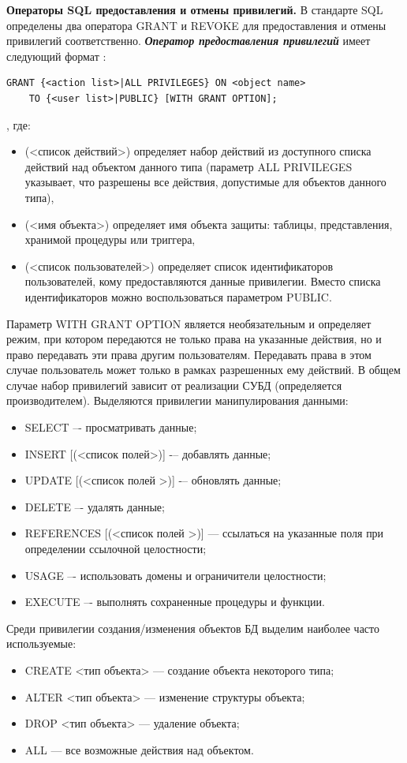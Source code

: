 \textbf{Операторы SQL предоставления и отмены привилегий.} В стандарте SQL определены два оператора GRANT и
REVOKE для предоставления и отмены привилегий соответственно. \textit{\textbf{Оператор предоставления привилегий}}
имеет следующий формат \autocite{Skakun}:
\begin{lstlisting}[]
GRANT {<action list>|ALL PRIVILEGES} ON <object name>
    TO {<user list>|PUBLIC} [WITH GRANT OPTION];
\end{lstlisting}
, где:
\begin{itemize}
    \item <action list>(<список действий>) определяет набор действий из доступного списка действий над объектом
    данного типа (параметр ALL PRIVILEGES указывает, что разрешены все действия, допустимые для объектов данного
    типа),
    \item <object name>(<имя объекта>) определяет имя объекта защиты: таблицы, представления, хранимой
    процедуры или триггера,
    \item <user list>(<список пользователей>) определяет список идентификаторов пользователей, кому предоставляются
    данные привилегии. Вместо списка идентификаторов можно воспользоваться параметром PUBLIC.
\end{itemize}
Параметр WITH GRANT OPTION является необязательным и определяет режим, при котором передаются не только права
на указанные действия, но и право передавать эти права другим пользователям. Передавать права в этом случае
пользователь может только в рамках разрешенных ему действий. В общем случае набор привилегий зависит от
реализации СУБД (определяется производителем). Выделяются привилегии манипулирования данными:
\begin{itemize}
    \item SELECT –- просматривать данные;
    \item INSERT [(<список полей>)] -– добавлять данные;
    \item UPDATE [(<список полей >)] -– обновлять данные;
    \item DELETE –- удалять данные;
    \item REFERENCES [(<список полей >)] --- ссылаться на указанные поля при определении ссылочной целостности;
    \item USAGE –- использовать домены и ограничители целостности;
    \item EXECUTE –- выполнять сохраненные процедуры и функции.
\end{itemize}
Среди привилегии создания/изменения объектов БД выделим наиболее часто используемые:
\begin{itemize}
    \item CREATE <тип объекта> --- создание объекта некоторого типа;
    \item ALTER <тип объекта> --- изменение структуры объекта;
    \item DROP <тип объекта> --- удаление объекта;
    \item ALL --- все возможные действия над объектом.
\end{itemize}

